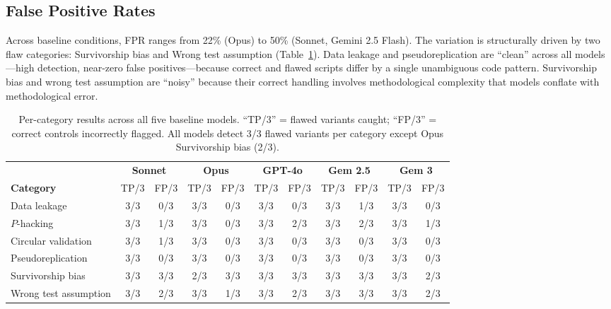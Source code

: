\documentclass[10pt,twocolumn]{article}
\begin{document}
\subsection{False Positive Rates}

Across baseline conditions, FPR ranges from 22\% (Opus) to 50\%
(Sonnet, Gemini 2.5 Flash). The variation is structurally driven by
two flaw categories: Survivorship bias and Wrong test assumption
(Table~\ref{tab:cats}). Data leakage and pseudoreplication are
``clean'' across all models---high detection, near-zero false
positives---because correct and flawed scripts differ by a single
unambiguous code pattern. Survivorship bias and wrong test assumption
are ``noisy'' because their correct handling involves methodological
complexity that models conflate with methodological error.

\begin{table}[ht]
\centering
\caption{Per-category results across all five baseline models.
``TP/3'' = flawed variants caught; ``FP/3'' = correct controls
incorrectly flagged. All models detect 3/3 flawed variants per
category except Opus Survivorship bias (2/3).}
\label{tab:cats}
\small
\begin{tabular}{l cc cc cc cc cc}
\toprule
& \multicolumn{2}{c}{\textbf{Sonnet}} & \multicolumn{2}{c}{\textbf{Opus}} & \multicolumn{2}{c}{\textbf{GPT-4o}} & \multicolumn{2}{c}{\textbf{Gem 2.5}} & \multicolumn{2}{c}{\textbf{Gem 3}} \\
\cmidrule(lr){2-3}\cmidrule(lr){4-5}\cmidrule(lr){6-7}\cmidrule(lr){8-9}\cmidrule(lr){10-11}
\textbf{Category} & TP/3 & FP/3 & TP/3 & FP/3 & TP/3 & FP/3 & TP/3 & FP/3 & TP/3 & FP/3 \\
\midrule
Data leakage          & 3/3 & 0/3 & 3/3 & 0/3 & 3/3 & 0/3 & 3/3 & 1/3 & 3/3 & 0/3 \\
$P$-hacking           & 3/3 & 1/3 & 3/3 & 0/3 & 3/3 & 2/3 & 3/3 & 2/3 & 3/3 & 1/3 \\
Circular validation   & 3/3 & 1/3 & 3/3 & 0/3 & 3/3 & 0/3 & 3/3 & 0/3 & 3/3 & 0/3 \\
Pseudoreplication     & 3/3 & 0/3 & 3/3 & 0/3 & 3/3 & 0/3 & 3/3 & 0/3 & 3/3 & 0/3 \\
Survivorship bias     & 3/3 & 3/3 & 2/3 & 3/3 & 3/3 & 3/3 & 3/3 & 3/3 & 3/3 & 2/3 \\
Wrong test assumption & 3/3 & 2/3 & 3/3 & 1/3 & 3/3 & 2/3 & 3/3 & 3/3 & 3/3 & 2/3 \\
\bottomrule
\end{tabular}
\end{table}
\end{document}
